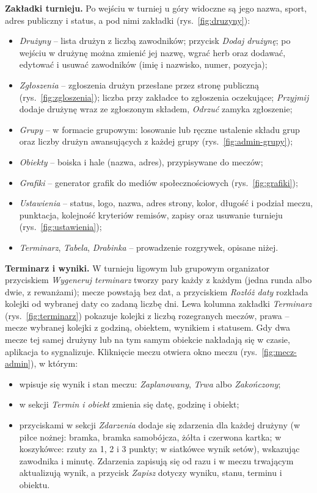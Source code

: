 \documentclass[11pt,a4paper,oneside]{article}
\begin{document}
\textbf{Zakładki turnieju.} Po wejściu w turniej u góry widoczne są jego nazwa, sport, adres publiczny i status, a pod nimi zakładki (rys.~\ref{fig:druzyny}):
\begin{itemize}
\item \emph{Drużyny} -- lista drużyn z liczbą zawodników; przycisk \emph{Dodaj drużynę}; po wejściu w drużynę można zmienić jej nazwę, wgrać herb oraz dodawać, edytować i usuwać zawodników (imię i nazwisko, numer, pozycja);
\item \emph{Zgłoszenia} -- zgłoszenia drużyn przesłane przez stronę publiczną (rys.~\ref{fig:zgloszenia}); liczba przy zakładce to zgłoszenia oczekujące; \emph{Przyjmij} dodaje drużynę wraz ze zgłoszonym składem, \emph{Odrzuć} zamyka zgłoszenie;
\item \emph{Grupy} -- w formacie grupowym: losowanie lub ręczne ustalenie składu grup oraz liczby drużyn awansujących z każdej grupy (rys.~\ref{fig:admin-grupy});
\item \emph{Obiekty} -- boiska i hale (nazwa, adres), przypisywane do meczów;
\item \emph{Grafiki} -- generator grafik do mediów społecznościowych (rys.~\ref{fig:grafiki});
\item \emph{Ustawienia} -- status, logo, nazwa, adres strony, kolor, długość i podział meczu, punktacja, kolejność kryteriów remisów, zapisy oraz usuwanie turnieju (rys.~\ref{fig:ustawienia});
\item \emph{Terminarz}, \emph{Tabela}, \emph{Drabinka} -- prowadzenie rozgrywek, opisane niżej.
\end{itemize}


\textbf{Terminarz i wyniki.} W turnieju ligowym lub grupowym organizator przyciskiem \emph{Wygeneruj terminarz} tworzy pary każdy z każdym (jedna runda albo dwie, z rewanżami); mecze powstają bez dat, a przyciskiem \emph{Rozłóż daty} rozkłada kolejki od wybranej daty co zadaną liczbę dni. Lewa kolumna zakładki \emph{Terminarz} (rys.~\ref{fig:terminarz}) pokazuje kolejki z liczbą rozegranych meczów, prawa -- mecze wybranej kolejki z godziną, obiektem, wynikiem i statusem. Gdy dwa mecze tej samej drużyny lub na tym samym obiekcie nakładają się w czasie, aplikacja to sygnalizuje. Kliknięcie meczu otwiera okno meczu (rys.~\ref{fig:mecz-admin}), w którym:
\begin{itemize}
\item wpisuje się wynik i stan meczu: \emph{Zaplanowany}, \emph{Trwa} albo \emph{Zakończony};
\item w sekcji \emph{Termin i obiekt} zmienia się datę, godzinę i obiekt;
\item przyciskami w sekcji \emph{Zdarzenia} dodaje się zdarzenia dla każdej drużyny (w piłce nożnej: bramka, bramka samobójcza, żółta i czerwona kartka; w koszykówce: rzuty za 1, 2 i 3 punkty; w siatkówce wynik setów), wskazując zawodnika i minutę. Zdarzenia zapisują się od razu i w meczu trwającym aktualizują wynik, a przycisk \emph{Zapisz} dotyczy wyniku, stanu, terminu i obiektu.
\end{itemize}
\end{document}
